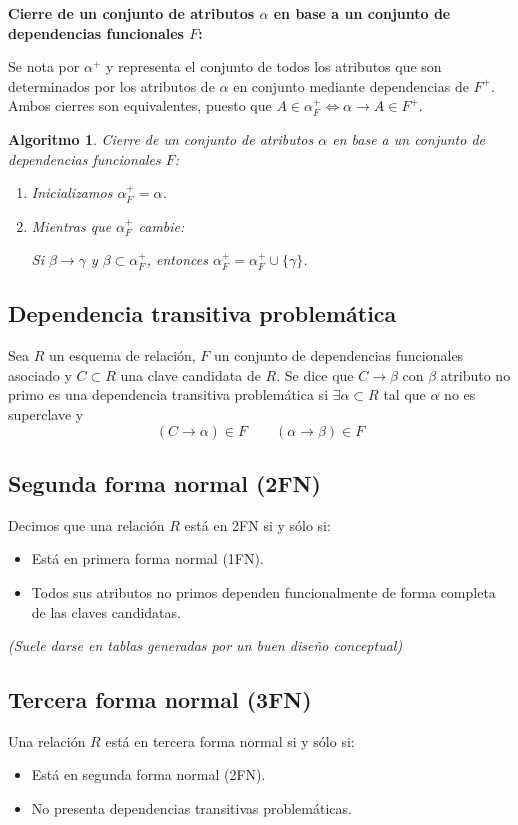 \documentclass[12pt,a4paper]{article}
\theoremstyle{ejemplo}
\theoremstyle{algoritmo}
\newtheorem*{alg}{Algoritmo} %
\begin{document}
\textbf{Cierre de un conjunto de atributos $\alpha$ en base a un conjunto de 
dependencias funcionales $F$:}

Se nota por $\alpha^+$ y representa el conjunto de todos los atributos que son 
determinados por los atributos de $\alpha$ en conjunto mediante dependencias 
de $F^+$.
\\

Ambos cierres son equivalentes, puesto que $A\in\alpha_F^+\iff\alpha\to A\in F^+$.

\begin{alg}
Cierre de un conjunto de atributos $\alpha$ en base a un conjunto de 
dependencias funcionales $F$:
\begin{enumerate}
	\item Inicializamos $\alpha_F^+=\alpha$.
	\item Mientras que $\alpha_F^+$ cambie:
	
	\quad\quad Si $\beta\to\gamma$ y $\beta\subset\alpha_F^+$, entonces $
	\alpha_F^+=\alpha_F^+\cup\{\gamma\}$.
\end{enumerate}
\end{alg}

\subsection*{Dependencia transitiva problemática}
Sea $R$ un esquema de relación, $F$ un conjunto de dependencias funcionales
asociado y $C\subset R$ una clave candidata de $R$. Se dice que $C\to\beta$ con
$\beta$ atributo no primo es una dependencia transitiva problemática si $
\exists\alpha\subset R$ tal que $\alpha$ no es superclave y 
$$(C\to\alpha)\in F\quad\quad(\alpha\to\beta)\in F$$

\subsection*{Segunda forma normal (2FN)}
Decimos que una relación $R$ está en 2FN si y sólo si:
\begin{itemize}[noitemsep]
	\item Está en primera forma normal (1FN).
	\item Todos sus atributos no primos dependen funcionalmente de forma 
	completa de las claves candidatas.
\end{itemize}
\textit{(Suele darse en tablas generadas por un buen diseño conceptual)}

\subsection*{Tercera forma normal (3FN)}
Una relación $R$ está en tercera forma normal si y sólo si:
\begin{itemize}[noitemsep]
	\item Está en segunda forma normal (2FN).
	\item No presenta dependencias transitivas problemáticas.
\end{itemize}
\end{document}
